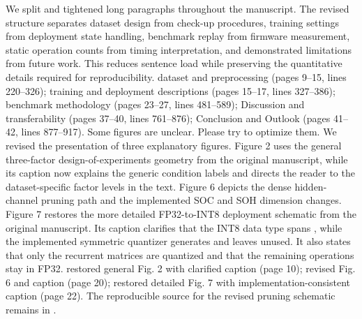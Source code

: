 {} We split and tightened long paragraphs throughout the manuscript. The revised structure separates dataset design from check-up procedures, training settings from deployment state handling, benchmark replay from firmware measurement, static operation counts from timing interpretation, and demonstrated limitations from future work. This reduces sentence load while preserving the quantitative details required for reproducibility.\markdownRendererParagraphSeparator
{} dataset and preprocessing (pages 9--15, lines 220--326); training and deployment descriptions (pages 15--17, lines 327--386); benchmark methodology (pages 23--27, lines 481--589); Discussion and transferability (pages 37--40, lines 761--876); Conclusion and Outlook (pages 41--42, lines 877--917).\markdownRendererInterblockSeparator
{}
\markdownRendererSectionEnd \markdownRendererSectionBegin
{}\markdownRendererInterblockSeparator
{}\markdownRendererBlockQuoteBegin
Some figures are unclear. Please try to optimize them.\markdownRendererBlockQuoteEnd \markdownRendererInterblockSeparator
{} We revised the presentation of three explanatory figures. Figure 2 uses the general three-factor design-of-experiments geometry from the original manuscript, while its caption now explains the generic condition labels and directs the reader to the dataset-specific factor levels in the text. Figure 6 depicts the dense hidden-channel pruning path and the implemented SOC and SOH dimension changes. Figure 7 restores the more detailed FP32-to-INT8 deployment schematic from the original manuscript. Its caption clarifies that the INT8 data type spans , while the implemented symmetric quantizer generates  and leaves  unused. It also states that only the recurrent matrices are quantized and that the remaining operations stay in FP32.\markdownRendererParagraphSeparator
{} restored general Fig. 2 with clarified caption (page 10); revised Fig. 6 and caption (page 20); restored detailed Fig. 7 with implementation-consistent caption (page 22). The reproducible source for the revised pruning schematic remains in .\markdownRendererInterblockSeparator
